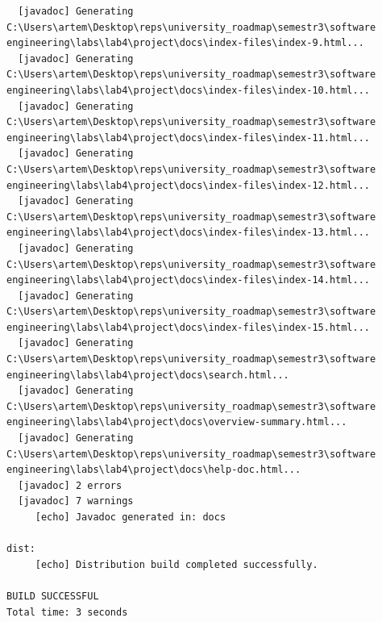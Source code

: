 \documentclass[12pt,a4paper]{article}
\begin{document}
\begin{verbatim}
  [javadoc] Generating C:\Users\artem\Desktop\reps\university_roadmap\semestr3\software engineering\labs\lab4\project\docs\index-files\index-9.html...
  [javadoc] Generating C:\Users\artem\Desktop\reps\university_roadmap\semestr3\software engineering\labs\lab4\project\docs\index-files\index-10.html...
  [javadoc] Generating C:\Users\artem\Desktop\reps\university_roadmap\semestr3\software engineering\labs\lab4\project\docs\index-files\index-11.html...
  [javadoc] Generating C:\Users\artem\Desktop\reps\university_roadmap\semestr3\software engineering\labs\lab4\project\docs\index-files\index-12.html...
  [javadoc] Generating C:\Users\artem\Desktop\reps\university_roadmap\semestr3\software engineering\labs\lab4\project\docs\index-files\index-13.html...
  [javadoc] Generating C:\Users\artem\Desktop\reps\university_roadmap\semestr3\software engineering\labs\lab4\project\docs\index-files\index-14.html...
  [javadoc] Generating C:\Users\artem\Desktop\reps\university_roadmap\semestr3\software engineering\labs\lab4\project\docs\index-files\index-15.html...
  [javadoc] Generating C:\Users\artem\Desktop\reps\university_roadmap\semestr3\software engineering\labs\lab4\project\docs\search.html...
  [javadoc] Generating C:\Users\artem\Desktop\reps\university_roadmap\semestr3\software engineering\labs\lab4\project\docs\overview-summary.html...
  [javadoc] Generating C:\Users\artem\Desktop\reps\university_roadmap\semestr3\software engineering\labs\lab4\project\docs\help-doc.html...
  [javadoc] 2 errors
  [javadoc] 7 warnings
     [echo] Javadoc generated in: docs

dist:
     [echo] Distribution build completed successfully.

BUILD SUCCESSFUL
Total time: 3 seconds


\end{verbatim}
\end{document}
